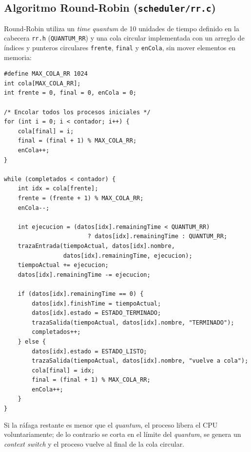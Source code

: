 \documentclass[12pt]{article}
\begin{document}
\newpage
    \subsection{Algoritmo Round-Robin (\texttt{scheduler/rr.c})}
    Round-Robin utiliza un \textit{time quantum} de 10 unidades de tiempo definido en la cabecera \texttt{rr.h} (\texttt{QUANTUM\_RR}) y una cola circular implementada con un arreglo de índices y punteros circulares \texttt{frente}, \texttt{final} y \texttt{enCola}, sin mover elementos en memoria:
    \begin{lstlisting}[caption={Cola circular y ejecución por quantum en RR.}]
#define MAX_COLA_RR 1024
int cola[MAX_COLA_RR];
int frente = 0, final = 0, enCola = 0;

/* Encolar todos los procesos iniciales */
for (int i = 0; i < contador; i++) {
    cola[final] = i;
    final = (final + 1) % MAX_COLA_RR;
    enCola++;
}

while (completados < contador) {
    int idx = cola[frente];
    frente = (frente + 1) % MAX_COLA_RR;
    enCola--;

    int ejecucion = (datos[idx].remainingTime < QUANTUM_RR)
                        ? datos[idx].remainingTime : QUANTUM_RR;
    trazaEntrada(tiempoActual, datos[idx].nombre,
                 datos[idx].remainingTime, ejecucion);
    tiempoActual += ejecucion;
    datos[idx].remainingTime -= ejecucion;

    if (datos[idx].remainingTime == 0) {
        datos[idx].finishTime = tiempoActual;
        datos[idx].estado = ESTADO_TERMINADO;
        trazaSalida(tiempoActual, datos[idx].nombre, "TERMINADO");
        completados++;
    } else {
        datos[idx].estado = ESTADO_LISTO;
        trazaSalida(tiempoActual, datos[idx].nombre, "vuelve a cola");
        cola[final] = idx;
        final = (final + 1) % MAX_COLA_RR;
        enCola++;
    }
}
    \end{lstlisting}
    Si la ráfaga restante es menor que el \textit{quantum}, el proceso libera el CPU voluntariamente; de lo contrario se corta en el límite del \textit{quantum}, se genera un \textit{context switch} y el proceso vuelve al final de la cola circular.
\end{document}
